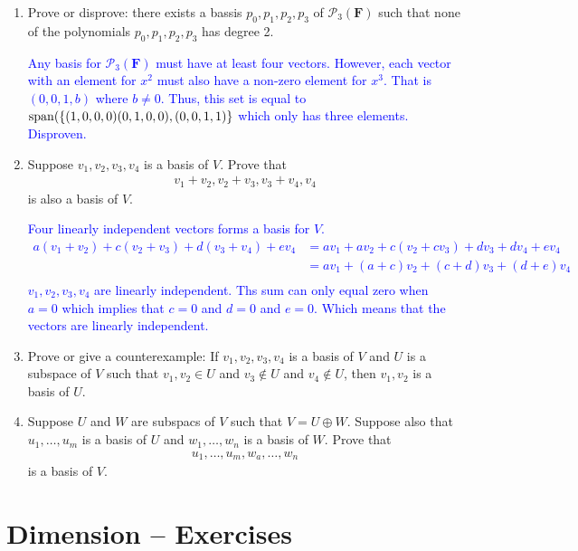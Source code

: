 \documentclass[10pt,a4paper]{report}
\newcommand{\BLUE}[1]{\textcolor{blue}{#1}}
\newcommand{\F}{\textbf{F}}
\begin{document}
\begin{enumerate}
	\item Prove or disprove: there exists a bassis $p_0, p_1,p_2,p_3$ of $\mathcal{P}_3(\F)$ such that none of the polynomials $p_0,p_1,p_2,p_3$ has degree 2.

	\BLUE{Any basis for $\mathcal{P}_3(\F)$ must have at least four vectors.  However, each vector with an element for $x^2$ must also have a non-zero element for $x^3$.  That is $(0,0,1,b)$ where $b \ne 0$.  Thus, this set is equal to $\operatorname{span}(\{(1,0,0,0)(0,1,0,0),(0,0,1,1)\}$ which only has three elements.  Disproven.
	}
	
	\item Suppose $v_1,v_2,v_3,v_4$ is a basis of $V$.  Prove that 
	\begin{align*}
		v_1+v_2,v_2+v_3,v_3+v_4, v_4
	\end{align*}is also a basis of $V$.
	
	\BLUE{Four linearly independent vectors forms a basis for $V$.
	\begin{align*}
		a(v_1+v_2)+c(v_2+v_3)+d(v_3+v_4)+ ev_4 &= av_1+av_2+c(v_2+cv_3)+dv_3+dv_4+ev_4 \\
		&= av_1+(a+c)v_2+(c+d)v_3+(d+e)v_4 \\
	\end{align*} $v_1,v_2,v_3,v_4$ are linearly independent.  Ths sum can only equal zero when $a=0$ which implies that $c=0$ and $d=0$ and $e=0$. Which means that the vectors are linearly independent.
	}
	
	\item Prove or give a counterexample:  If $v_1,v_2,v_3,v_4$ is a basis of $V$ and $U$ is a subspace of $V$ such that $v_1,v_2 \in U$ and $v_3\not\in U$ and $v_4 \not\in U$, then $v_1,v_2$ is a basis of $U$.
	
	\item Suppose $U$ and $W$ are subspacs of $V$ such that $V=U \oplus W$.  Suppose also that $u_1,\dots,u_m$ is a basis of $U$ and $w_1,\dots,w_n$ is a basis of $W$. Prove that 
	\begin{align*}
		u_1,\dots,u_m,w_a,\dots,w_n
	\end{align*}is a basis of $V$.
\end{enumerate}


\section{Dimension -- Exercises}
\newcommand{\PP}[1]{\mathcal{P}_#1(\F)}
\newcommand{\PPP}{\mathcal{P}}
\end{document}
